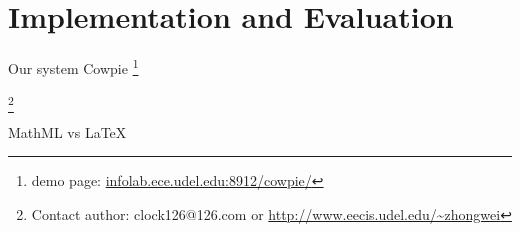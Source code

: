 \chapter{Implementation and Evaluation}

Our system Cowpie \footnote{demo page: \url{infolab.ece.udel.edu:8912/cowpie/}}


\let\thefootnote\relax\footnote{Contact author: clock126@126.com or
\url{http://www.eecis.udel.edu/~zhongwei}}

MathML vs LaTeX
